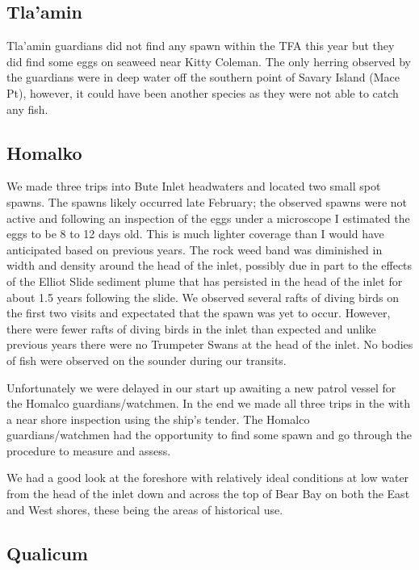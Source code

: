 \subsection{Tla'amin}

Tla'amin guardians did not find any spawn within the TFA this year but
they did find some eggs on seaweed near Kitty Coleman.
The only herring observed by the guardians were
in deep water off the southern point of Savary Island (Mace Pt), however,
it could have been another species as they were not able to catch any fish.

\subsection{Homalko}

We made three trips into Bute Inlet headwaters and located two small spot spawns.
The spawns likely occurred late February;
the observed spawns were not active and
following an inspection of the eggs under a microscope
I estimated the eggs to be 8 to 12 days old.
This is much lighter coverage than I would have anticipated based on previous years.
The rock weed band was diminished in width and density around the head of the inlet,
possibly due in part to the effects of the Elliot Slide sediment plume that
has persisted in the head of the inlet for about 1.5 years following the slide.
We observed several rafts of diving birds on the first two visits and
expectated that the spawn was yet to occur.
However, there were fewer rafts of diving birds in the inlet than expected and
unlike previous years there were no Trumpeter Swans at the head of the inlet.
No bodies of fish were observed on the sounder during our transits.

Unfortunately we were delayed in our start up
awaiting a new patrol vessel for the Homalco guardians/watchmen.
In the end we made all three trips in the 
with a near shore inspection using the ship's tender.
The Homalco guardians/watchmen had the opportunity to
find some spawn and go through the procedure to measure and assess.

We had a good look at the foreshore
with relatively ideal conditions at low water from
the head of the inlet down and across the top of Bear Bay
on both the East and West shores,
these being the areas of historical use.

\subsection{Qualicum}


